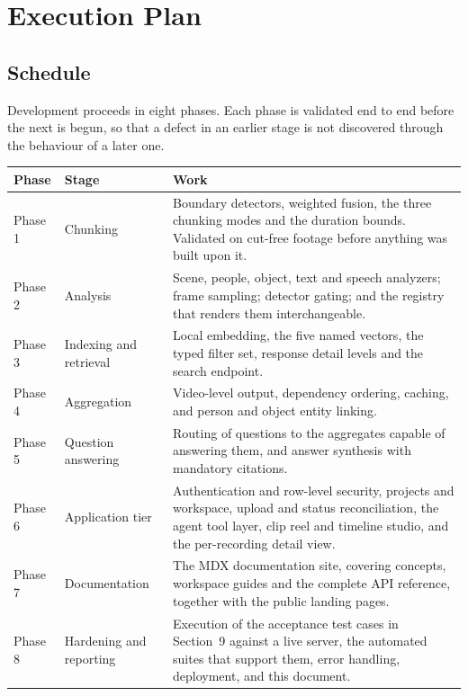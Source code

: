 \section{Execution Plan}

\subsection{Schedule}

Development proceeds in eight phases. Each phase is validated end to end before the
next is begun, so that a defect in an earlier stage is not discovered through the
behaviour of a later one.

\begin{table}[htbp]
\centering
\small
\begin{tabularx}{\textwidth}{@{}L{1.9cm}L{4.0cm}X@{}}
\toprule
\textbf{Phase} & \textbf{Stage} & \textbf{Work} \\
\midrule
Phase 1 & Chunking &
Boundary detectors, weighted fusion, the three chunking modes and the duration bounds.
Validated on cut-free footage before anything was built upon it. \\
Phase 2 & Analysis &
Scene, people, object, text and speech analyzers; frame sampling; detector gating; and
the registry that renders them interchangeable. \\
Phase 3 & Indexing and retrieval &
Local embedding, the five named vectors, the typed filter set, response detail levels
and the search endpoint. \\
Phase 4 & Aggregation &
Video-level output, dependency ordering, caching, and person and object entity
linking. \\
Phase 5 & Question answering &
Routing of questions to the aggregates capable of answering them, and answer synthesis
with mandatory citations. \\
Phase 6 & Application tier &
Authentication and row-level security, projects and workspace, upload and status
reconciliation, the agent tool layer, clip reel and timeline studio, and the
per-recording detail view. \\
Phase 7 & Documentation &
The MDX documentation site, covering concepts, workspace guides and the complete API
reference, together with the public landing pages. \\
Phase 8 & Hardening and reporting &
Execution of the acceptance test cases in Section~9 against a live server, the automated
suites that support them, error handling, deployment, and this document. \\
\bottomrule
\end{tabularx}
\end{table}

